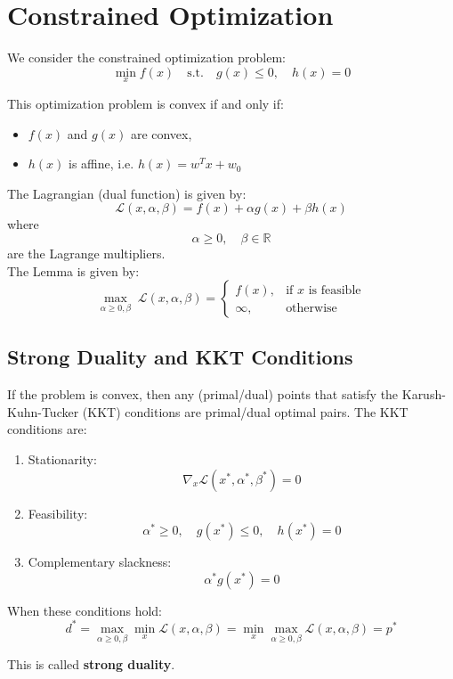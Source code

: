 \documentclass[11pt]{article}
\begin{document}
\section*{Constrained Optimization}

We consider the constrained optimization problem:
\[
\min_{x} f(x) \quad \text{s.t.} \quad g(x) \leq 0, \quad h(x) = 0
\]

This optimization problem is convex if and only if:
\begin{itemize}
    \item $f(x)$ and $g(x)$ are convex,
    \item $h(x)$ is affine, i.e. \(h(x) = w^T x + w_0\)
\end{itemize}
The Lagrangian (dual function) is given by:
\[
\mathcal{L}(x, \alpha, \beta) = f(x) + \alpha g(x) + \beta h(x)
\]
where
\[
\alpha \geq 0, \quad \beta \in \mathbb{R}
\]
are the Lagrange multipliers.\\ 
The Lemma is given by:
\[
\max_{\alpha \geq 0, \beta} \; \mathcal{L}(x, \alpha, \beta) =
\begin{cases}
f(x), & \text{if $x$ is feasible} \\
\infty, & \text{otherwise}
\end{cases}
\]



\subsection*{Strong Duality and KKT Conditions}

If the problem is convex, then any (primal/dual) points that satisfy the
Karush-Kuhn-Tucker (KKT) conditions are primal/dual optimal pairs. The KKT conditions are:

\begin{enumerate}
    \item Stationarity: 
    \[
    \nabla_x \mathcal{L}(x^*, \alpha^*, \beta^*) = 0
    \]
    \item Feasibility:
    \[
    \alpha^* \geq 0, \quad g(x^*) \leq 0, \quad h(x^*) = 0
    \]
    \item Complementary slackness:
    \[
    \alpha^* g(x^*) = 0
    \]
\end{enumerate}

When these conditions hold:
\[
d^* = \max_{\alpha \geq 0, \beta} \min_x \mathcal{L}(x, \alpha, \beta) 
= \min_x \max_{\alpha \geq 0, \beta} \mathcal{L}(x, \alpha, \beta) = p^*
\]

This is called \textbf{strong duality}.
\end{document}
